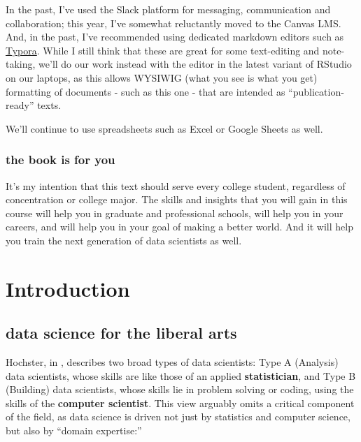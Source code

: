 \documentclass[
  openany]{book}
\begin{document}
In the past, I've used the Slack platform for messaging, communication and collaboration; this year, I've somewhat reluctantly moved to the Canvas LMS. And, in the past, I've recommended using dedicated markdown editors such as \href{https://typora.io/}{Typora}. While I still think that these are great for some text-editing and note-taking, we'll do our work instead with the editor in the latest variant of RStudio on our laptops, as this allows WYSIWIG (what you see is what you get) formatting of documents - such as this one - that are intended as ``publication-ready'' texts.

We'll continue to use spreadsheets such as Excel or Google Sheets as well.

\hypertarget{the-book-is-for-you}{%
\section*{the book is for you}\label{the-book-is-for-you}}

It's my intention that this text should serve every college student, regardless of concentration or college major. The skills and insights that you will gain in this course will help you in graduate and professional schools, will help you in your careers, and will help you in your goal of making a better world. And it will help you train the next generation of data scientists as well.

\hypertarget{part-introduction}{%
\part{Introduction}\label{part-introduction}}

\hypertarget{data-science-for-the-liberal-arts}{%
\chapter{data science for the liberal arts}\label{data-science-for-the-liberal-arts}}

Hochster, in \citep{hicks2018}, describes two broad types of data scientists: Type A (Analysis) data scientists, whose skills are like those of an applied \textbf{statistician}, and Type B (Building) data scientists, whose skills lie in problem solving or coding, using the skills of the \textbf{computer scientist}. This view arguably omits a critical component of the field, as data science is driven not just by statistics and computer science, but also by ``domain expertise:''
\end{document}
